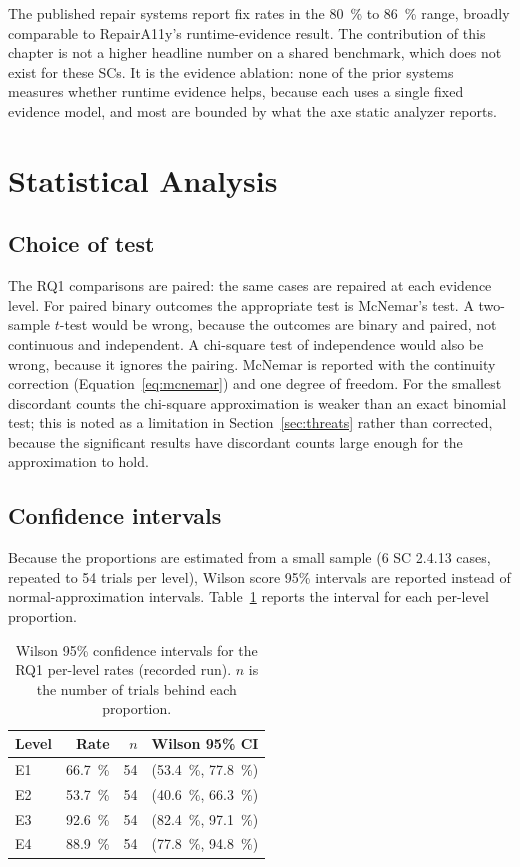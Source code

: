 \documentclass[11pt]{article}
\begin{document}
The published repair systems report fix rates in the \SI{80}{\percent} to
\SI{86}{\percent} range, broadly comparable to RepairA11y's runtime-evidence result.
The contribution of this chapter is not a higher headline number on a shared
benchmark, which does not exist for these SCs. It is the evidence ablation: none of
the prior systems measures whether runtime evidence helps, because each uses a single
fixed evidence model, and most are bounded by what the axe static analyzer reports.

\section{Statistical Analysis}

\subsection{Choice of test}

The RQ1 comparisons are paired: the same cases are repaired at each evidence level.
For paired binary outcomes the appropriate test is McNemar's test. A two-sample
$t$-test would be wrong, because the outcomes are binary and paired, not continuous
and independent. A chi-square test of independence would also be wrong, because it
ignores the pairing. McNemar is reported with the continuity correction
(Equation~\ref{eq:mcnemar}) and one degree of freedom. For the smallest discordant
counts the chi-square approximation is weaker than an exact binomial test; this is
noted as a limitation in Section~\ref{sec:threats} rather than corrected, because the
significant results have discordant counts large enough for the approximation to hold.

\subsection{Confidence intervals}

Because the proportions are estimated from a small sample (6 SC 2.4.13 cases, repeated
to 54 trials per level), Wilson score 95\% intervals are reported instead of
normal-approximation intervals. Table~\ref{tab:wilson} reports the interval for each
per-level proportion.

\begin{table}[h]
\centering
\caption{Wilson 95\% confidence intervals for the RQ1 per-level rates (recorded run).
$n$ is the number of trials behind each proportion.}
\label{tab:wilson}
\begin{tabular}{lrrl}
\toprule
Level & Rate & $n$ & Wilson 95\% CI \\
\midrule
E1 & \SI{66.7}{\percent} & 54 & (\SI{53.4}{\percent}, \SI{77.8}{\percent}) \\
E2 & \SI{53.7}{\percent} & 54 & (\SI{40.6}{\percent}, \SI{66.3}{\percent}) \\
E3 & \SI{92.6}{\percent} & 54 & (\SI{82.4}{\percent}, \SI{97.1}{\percent}) \\
E4 & \SI{88.9}{\percent} & 54 & (\SI{77.8}{\percent}, \SI{94.8}{\percent}) \\
\bottomrule
\end{tabular}
\end{table}
\end{document}
